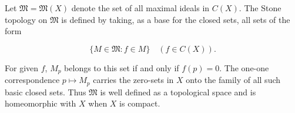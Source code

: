 Let \(\mathfrak{M} = \mathfrak{M}(X)\) denote the set of all maximal ideals in \(C(X)\). The Stone topology on \(\mathfrak{M}\) is defined by taking, as a base for the closed sets, all sets of the form

\[
\{ M \in \mathfrak{M} : f \in M \} \quad (f \in C(X)).
\]

For given \(f\), \(M_p\) belongs to this set if and only if \(f(p) = 0\). The one-one correspondence \(p \mapsto M_p\) carries the zero-sets in \(X\) onto the family of all such basic closed sets. Thus \(\mathfrak{M}\) is well defined as a topological space and is homeomorphic with \(X\) when \(X\) is compact.
